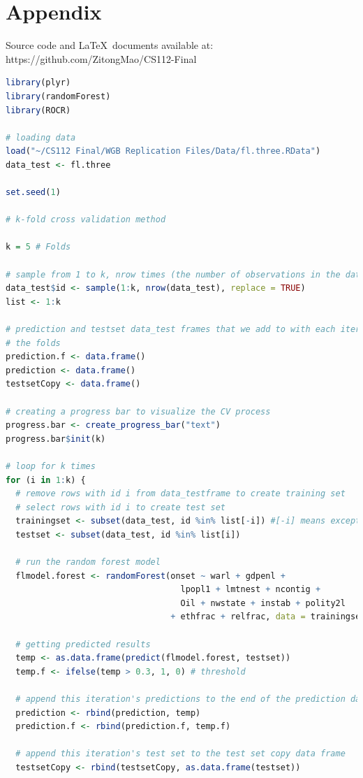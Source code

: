 \documentclass{article}
\begin{document}
\section{Appendix}
Source code and \LaTeX\ documents available at: https://github.com/ZitongMao/CS112-Final

\begin{lstlisting}[language=R, caption=k-fold Cross Validation: Random Forest as an example]
library(plyr)
library(randomForest)
library(ROCR)

# loading data
load("~/CS112 Final/WGB Replication Files/Data/fl.three.RData")
data_test <- fl.three

set.seed(1)

# k-fold cross validation method

k = 5 # Folds

# sample from 1 to k, nrow times (the number of observations in the data_test)
data_test$id <- sample(1:k, nrow(data_test), replace = TRUE)
list <- 1:k

# prediction and testset data_test frames that we add to with each iteration over
# the folds
prediction.f <- data.frame()
prediction <- data.frame()
testsetCopy <- data.frame()

# creating a progress bar to visualize the CV process
progress.bar <- create_progress_bar("text")
progress.bar$init(k)

# loop for k times
for (i in 1:k) {
  # remove rows with id i from data_testframe to create training set
  # select rows with id i to create test set
  trainingset <- subset(data_test, id %in% list[-i]) #[-i] means except i
  testset <- subset(data_test, id %in% list[i])
  
  # run the random forest model
  flmodel.forest <- randomForest(onset ~ warl + gdpenl + 
                                   lpopl1 + lmtnest + ncontig + 
                                   Oil + nwstate + instab + polity2l
                                 + ethfrac + relfrac, data = trainingset, importance = TRUE)
  
  # getting predicted results
  temp <- as.data.frame(predict(flmodel.forest, testset))
  temp.f <- ifelse(temp > 0.3, 1, 0) # threshold
  
  # append this iteration's predictions to the end of the prediction data_test frame
  prediction <- rbind(prediction, temp)
  prediction.f <- rbind(prediction.f, temp.f)
  
  # append this iteration's test set to the test set copy data frame
  testsetCopy <- rbind(testsetCopy, as.data.frame(testset))
  

\end{lstlisting}
\end{document}
